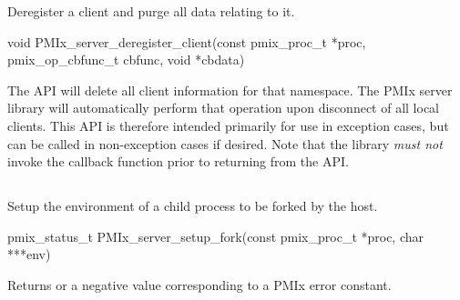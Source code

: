 \summary

Deregister a client and purge all data relating to it.

\format

\cspecificstart
\begin{codepar}
void
PMIx_server_deregister_client(const pmix_proc_t *proc,
                        pmix_op_cbfunc_t cbfunc, void *cbdata)
\end{codepar}
\cspecificend

\begin{arglist}
\end{arglist}


\descr

The  \ac{API} will delete all client information for that namespace. The \ac{PMIx} server library will automatically perform that operation upon disconnect of all local clients.
This \ac{API} is therefore intended primarily for use in exception cases, but can be called in non-exception cases if desired. Note that the library \emph{must not} invoke the callback function prior to returning from the \ac{API}.


\subsection{}

\summary

Setup the environment of a child process to be forked by the host.

\format

\cspecificstart
\begin{codepar}
pmix_status_t
PMIx_server_setup_fork(const pmix_proc_t *proc,
                        char ***env)
\end{codepar}
\cspecificend

\begin{arglist}
\end{arglist}

Returns  or a negative value corresponding to a PMIx error constant.

